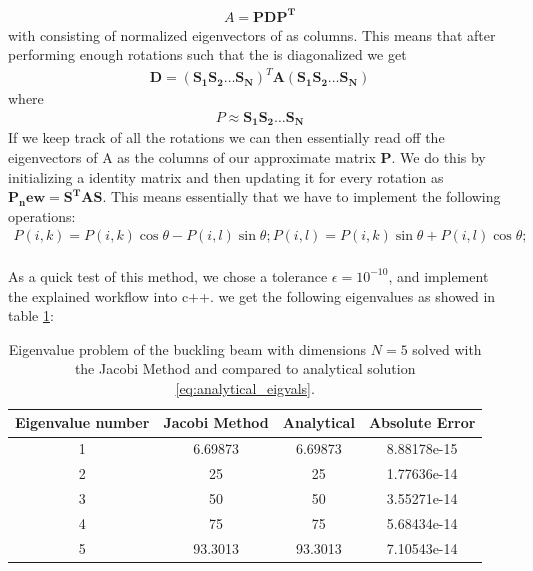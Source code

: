 \documentclass[american,a4paper,12pt]{article}
\renewcommand{\vec}[1]{\mathbf{#1}} %
\begin{document}
\begin{align*}
    A = \vec{P}\vec{D}\vec{P^T}
\end{align*}
with \vec{P} consisting of normalized eigenvectors of \vec{A} as columns. This means that after performing enough rotations such that the \vec{A} is diagonalized we get
\begin{align*}
    \vec{D} = (\vec{S_1}\vec{S_2}\hdots\vec{S_N})^T\vec{A}(\vec{S_1}\vec{S_2}\hdots\vec{S_N})
\end{align*}
where
\begin{align*}
    P \approx \vec{S_1}\vec{S_2}\hdots\vec{S_N}
\end{align*}
If we keep track of all the rotations we can then essentially read off the eigenvectors of A as the columns of our approximate matrix $\vec{P}$. We do this by initializing a identity matrix and then updating it for every rotation as $\vec{P_new} = \vec{S^T}\vec{A}\vec{S}$. This means essentially  that we have to implement the following operations:
\begin{align*}
    P(i,k) = P(i,k)\cos{\theta} - P(i,l)\sin{\theta};
    P(i,l) = P(i,k)\sin{\theta} + P(i,l)\cos{\theta};
\end{align*}
\\
As a quick test of this method, we chose a tolerance $\epsilon = 10^{-10}$, and implement the explained workflow into c++. we get the following eigenvalues as showed in table \ref{tab:5x5_testing}:
\begin{table}[H]
  \begin{center}
  \caption{Eigenvalue problem of the buckling beam with dimensions $N = 5$ solved with the Jacobi Method and compared to analytical solution \ref{eq:analytical_eigvals}.}
  \begin{tabular}{|c|c|c|c|} \hline
  \textbf{Eigenvalue number} & \textbf{Jacobi Method} & \textbf{Analytical} & \textbf{Absolute Error} \\ \hline     
    1 &            6.69873 &             6.69873 &         8.88178e-15 \\ \hline
    2 &                 25 &                  25 &         1.77636e-14 \\ \hline
    3 &                 50 &                  50 &         3.55271e-14 \\ \hline
    4 &                 75 &                  75 &         5.68434e-14 \\ \hline
    5 &            93.3013 &             93.3013 &         7.10543e-14 \\ \hline
  \end{tabular}
  \label{tab:5x5_testing}
  \end{center}
\end{table}
\end{document}
